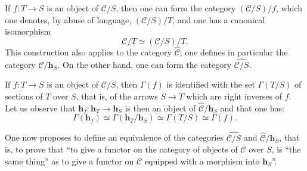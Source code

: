If \(f\colon T\to S\) is an object of \(\mathcal{C}/S\), then one can
form the category \((\mathcal{C}/S)/f\), which one denotes, by abuse of
language, \((\mathcal{C}/S)/T\), and one has a canonical isomorphism
\[
\mathcal{C}/T\simeq(\mathcal{C}/S)/T.
\]
This construction also applies to the category \(\widehat{\mathcal{C}}\);
one defines in particular the category
\(\widehat{\mathcal{C}}/\mathbf{h}_{S}\). On the other hand, one can
form the category \(\widehat{\mathcal{C}/S}\).

If \(f\colon T\to S\) is an object of \(\mathcal{C}/S\), then
\(\Gamma(f)\) is identified with the set \(\Gamma(T/S)\) of sections of
\(T\) over \(S\), that is, of the arrows \(S\to T\) which are right
inverses of \(f\). Let us observe that
\(\mathbf{h}_{f}\colon\mathbf{h}_{T}\to\mathbf{h}_{S}\) is then an
object of \(\widehat{\mathcal{C}}/\mathbf{h}_{S}\) and that one has:
\[
\Gamma(\mathbf{h}_{f})\simeq\Gamma(\mathbf{h}_{T}/\mathbf{h}_{S})
\simeq\Gamma(T/S)\simeq\Gamma(f).
\]

One now proposes to define an equivalence of the categories
\(\widehat{\mathcal{C}/S}\) and \(\widehat{\mathcal{C}}/\mathbf{h}_{S}\),
that is, to prove that ``to give a functor on the category of objects
of \(\mathcal{C}\) over \(S\), is ``the same thing'' as to give a functor
on \(\mathcal{C}\) equipped with a morphism into
\(\mathbf{h}_{S}\)''.

